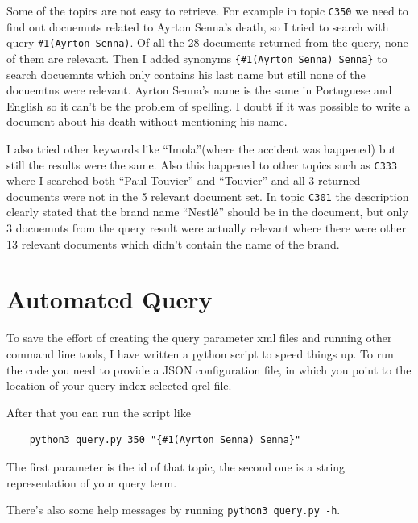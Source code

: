 \documentclass[11pt]{article} %
\begin{document}
Some of the topics are not easy to retrieve. For example in topic \verb|C350| we need to find out docuemnts related to Ayrton Senna's death, so I tried to search with query \verb|#1(Ayrton Senna)|. Of all the 28 documents returned from the query, none of them are relevant. Then I added synonyms \verb|{#1(Ayrton Senna) Senna}| to search docuemnts which only contains his last name but still none of the docuemtns were relevant. Ayrton Senna's name is the same in Portuguese and English so it can't be the problem of spelling. I doubt if it was possible to write a document about his death without mentioning his name.

I also tried other keywords like ``Imola''(where the accident was happened) but still the results were the same. Also this happened to other topics such as \verb|C333| where I searched both ``Paul Touvier'' and ``Touvier'' and all 3 returned documents were not in the 5 relevant document set. In topic \verb|C301| the description clearly stated that the brand name ``Nestlé'' should be in the document, but only 3 docuemnts from the query result were actually relevant where there were other 13 relevant documents which didn't contain the name of the brand.

\section{Automated Query}

To save the effort of creating the query parameter xml files and running other command line tools, I have written a python script to speed things up. To run the code you need to provide a JSON configuration file, in which you point to the location of your query index selected qrel file.

After that you can run the script like

\begin{lstlisting}
    python3 query.py 350 "{#1(Ayrton Senna) Senna}"
\end{lstlisting}

The first parameter is the id of that topic, the second one is a string representation of your query term.

There's also some help messages by running \verb|python3 query.py -h|.
\end{document}
